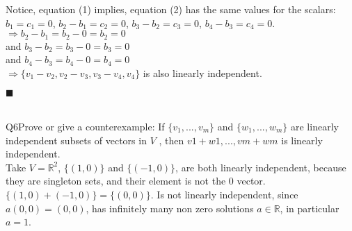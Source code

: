 \documentclass{article}
\begin{document}
Notice, equation (1) implies, equation (2) has the same values for the
scalars:\\ $b_1 = c_1 = 0$, $b_2-b_1 = c_2 = 0$, $b_3 -b_2 = c_3 = 0$,
$b_4 - b_3 = c_4 =0$.\\
$\Rightarrow b_2 -b_1 =b_2 -0 =b_2 =0$ \\and $b_3 - b_2 = b_3 - 0 = b_3
= 0$ \\and $b_4 -b_3 = b_4 - 0 = b_4 = 0$\\
$\Rightarrow \{v_1 − v_2 , v_2 − v_3 , v_3 − v_4 , v_4 \}$ is also
linearly independent.
\begin{flushright}$\blacksquare$\end{flushright}\\

Q6\quad Prove or give a counterexample:
If $\{v_1 , . . . , v_m\}$ and $\{w_1 , . . . , w_m\}$ are linearly independent subsets of vectors in $V$ , then
${v 1 + w 1 , . . . , v m + w m }$ is linearly independent.\\

Take $V = \mathbb{R}^2$, $\{(1,0)\}$ and $\{(-1,0)\}$, are both
linearly independent, because they are singleton sets, and their
element is not the $0$ vector. $\{(1,0)+(-1,0)\} = \{(0,0)\}$. Is not
linearly independent, since $a(0,0)=(0,0)$, has infinitely many non zero
solutions $a \in \mathbb{R}$, in particular $a=1$.
\end{document}
